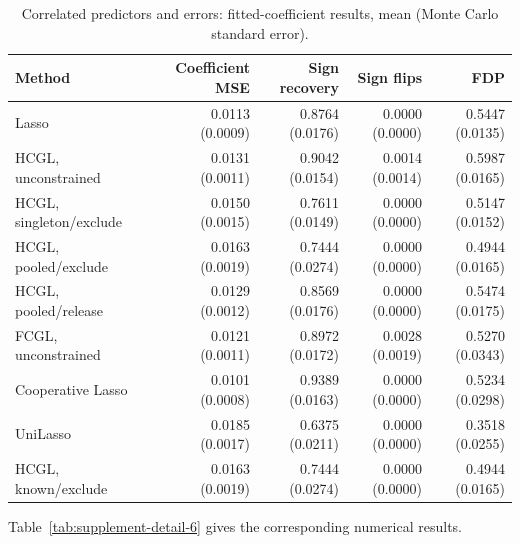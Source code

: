\documentclass[11pt,a4paper]{article}
\begin{document}
\begin{table}[htbp]\centering\small\setlength{\tabcolsep}{4pt}
\caption{Correlated predictors and errors: fitted-coefficient results, mean (Monte Carlo standard error).}
\begin{tabular}{lrrrr}\toprule
Method & Coefficient MSE & Sign recovery & Sign flips & FDP\\\midrule
Lasso & 0.0113 (0.0009) & 0.8764 (0.0176) & 0.0000 (0.0000) & 0.5447 (0.0135) \\
HCGL, unconstrained & 0.0131 (0.0011) & 0.9042 (0.0154) & 0.0014 (0.0014) & 0.5987 (0.0165) \\
HCGL, singleton/exclude & 0.0150 (0.0015) & 0.7611 (0.0149) & 0.0000 (0.0000) & 0.5147 (0.0152) \\
HCGL, pooled/exclude & 0.0163 (0.0019) & 0.7444 (0.0274) & 0.0000 (0.0000) & 0.4944 (0.0165) \\
HCGL, pooled/release & 0.0129 (0.0012) & 0.8569 (0.0176) & 0.0000 (0.0000) & 0.5474 (0.0175) \\
FCGL, unconstrained & 0.0121 (0.0011) & 0.8972 (0.0172) & 0.0028 (0.0019) & 0.5270 (0.0343) \\
Cooperative Lasso & 0.0101 (0.0008) & 0.9389 (0.0163) & 0.0000 (0.0000) & 0.5234 (0.0298) \\
UniLasso & 0.0185 (0.0017) & 0.6375 (0.0211) & 0.0000 (0.0000) & 0.3518 (0.0255) \\
HCGL, known/exclude & 0.0163 (0.0019) & 0.7444 (0.0274) & 0.0000 (0.0000) & 0.4944 (0.0165) \\
\bottomrule\end{tabular}
\label{tab:supplement-detail-5}
\end{table}

\noindent Table~\ref{tab:supplement-detail-6} gives the corresponding numerical results.
\end{document}
